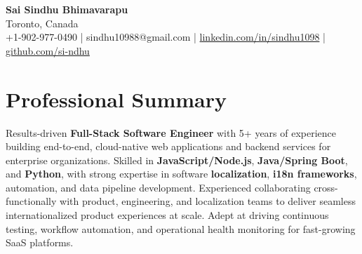 \documentclass[letterpaper,11pt]{article}
\begin{document}
\begin{center}
  {\Large \textbf{Sai Sindhu Bhimavarapu}} \\
  Toronto, Canada \\
  +1-902-977-0490 \enspace | \enspace sindhu10988@gmail.com \enspace | \enspace \href{https://www.linkedin.com/in/sindhu1098/}{linkedin.com/in/sindhu1098} \enspace | \enspace \href{https://github.com/si-ndhu}{github.com/si-ndhu}
\end{center}

\section{Professional Summary}
  \begin{itemize}[leftmargin=0.15in, label={}]
    \small{\item{
     Results-driven \textbf{Full-Stack Software Engineer} with 5+ years of experience building end-to-end, cloud-native web applications and backend services for enterprise organizations. Skilled in \textbf{JavaScript/Node.js}, \textbf{Java/Spring Boot}, and \textbf{Python}, with strong expertise in software \textbf{localization}, \textbf{i18n frameworks}, automation, and data pipeline development. Experienced collaborating cross-functionally with product, engineering, and localization teams to deliver seamless internationalized product experiences at scale. Adept at driving continuous testing, workflow automation, and operational health monitoring for fast-growing SaaS platforms.
    }}
  \end{itemize}
\vspace{-16pt}

\end{document}
